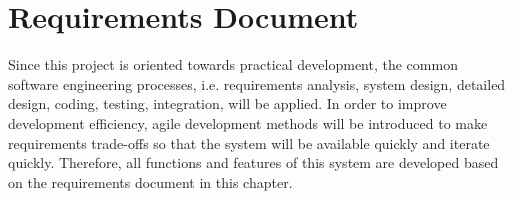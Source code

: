 
\chapter{Requirements Document} \label{chapter:requirement}
Since this project is oriented towards practical development, the common software engineering processes, i.e. requirements analysis, system design, detailed design, coding, testing, integration, will be applied. In order to improve development efficiency, agile development methods will be introduced to make requirements trade-offs so that the system will be available quickly and iterate quickly. Therefore, all functions and features of this system are developed based on the requirements document in this chapter.

